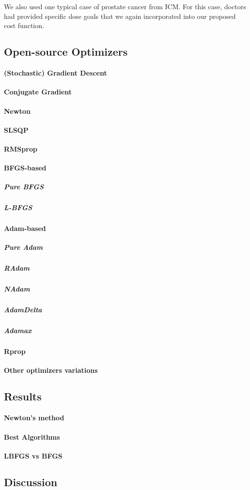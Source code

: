 We also used one typical case of prostate cancer from ICM.
For this case, doctors had provided specific dose goals that we again incorporated into our proposed cost function.

\subsection{Open-source Optimizers}
\paragraph{(Stochastic) Gradient Descent}
\paragraph{Conjugate Gradient}
\paragraph{Newton}
\paragraph{SLSQP}
\paragraph{RMSprop}
\paragraph{BFGS-based}
\subparagraph{Pure BFGS}
\subparagraph{L-BFGS}
\paragraph{Adam-based}
\subparagraph{Pure Adam}
\subparagraph{RAdam}
\subparagraph{NAdam}
\subparagraph{AdamDelta}
\subparagraph{Adamax}
\paragraph{Rprop}
\paragraph{Other optimizers variations}

\subsection{Results}
\paragraph{Newton's method}
\paragraph{Best Algorithms}
\paragraph{LBFGS vs BFGS}

\subsection{Discussion}
